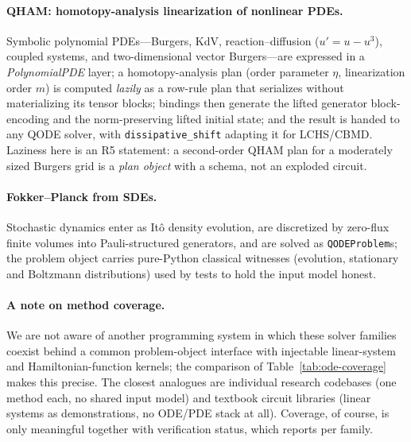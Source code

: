 \paragraph{QHAM: homotopy-analysis linearization of nonlinear PDEs.}
Symbolic polynomial PDEs---Burgers, KdV, reaction--diffusion ($u' = u -
u^3$), coupled systems, and two-dimensional vector Burgers---are expressed
in a \emph{PolynomialPDE} layer; a homotopy-analysis plan (order parameter
$\eta$, linearization order $m$) is computed \emph{lazily} as a row-rule
plan that serializes without materializing its tensor blocks; bindings then
generate the lifted generator block-encoding and the norm-preserving lifted
initial state; and the result is handed to any QODE solver, with
\texttt{dissipative\_shift} adapting it for LCHS/CBMD.  Laziness here is an
R5 statement: a second-order QHAM plan for a moderately sized Burgers grid
is a \emph{plan object} with a schema, not an exploded circuit.

\paragraph{Fokker--Planck from SDEs.}
Stochastic dynamics enter as It\^o density evolution, are discretized by
zero-flux finite volumes into Pauli-structured generators, and are solved as
\texttt{QODEProblem}s; the problem object carries pure-Python classical
witnesses (evolution, stationary and Boltzmann distributions) used by tests
to hold the input model honest.

\paragraph{A note on method coverage.}
We are not aware of another programming system in which these solver
families coexist behind a common problem-object interface with injectable
linear-system and Hamiltonian-function kernels; the comparison of
Table~\ref{tab:ode-coverage} makes this precise.  The closest analogues are
individual research codebases (one method each, no shared input model) and
textbook circuit libraries (linear systems as demonstrations, no ODE/PDE
stack at all).  Coverage, of course, is only meaningful together with
verification status, which  reports per family.
